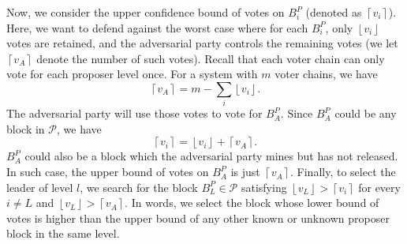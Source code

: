 Now, we consider the upper confidence bound of votes on $B_i^P$ (denoted as $\left \lceil v_{i} \right \rceil$). Here, we want to defend against the worst case where for each $B_i^P$, only $\left \lfloor v_{i} \right \rfloor$ votes are retained, and the adversarial party controls the remaining votes (we let $\left \lceil v_A \right \rceil$ denote the number of such votes). Recall that each voter chain can only vote for each proposer level once. For a system with $m$ voter chains, we have
$$\left \lceil v_A \right \rceil = m - \sum_{i}\left \lfloor v_{i} \right \rfloor.$$
The adversarial party will use those votes to vote for $B^P_A$. Since $B^P_A$ could be any block in $\mathcal P$, we have
$$\left \lceil v_i \right \rceil = \left \lfloor v_{i} \right \rfloor + \left \lceil v_A \right \rceil.$$
$B^P_A$ could also be a block which the adversarial party mines but has not released. In such case, the upper bound of votes on $B^P_A$ is just $\left \lceil v_A \right \rceil$. Finally, to select the leader of level $l$, we search for the block $B^P_L \in \mathcal P$ satisfying $\left \lfloor v_{L} \right \rfloor > \left \lceil v_i \right \rceil$ for every $i \neq L$ and $\left \lfloor v_{L} \right \rfloor > \left \lceil v_A \right \rceil$. In words, we select the block whose lower bound of votes is higher than the upper bound of any other known or unknown proposer block in the same level.

